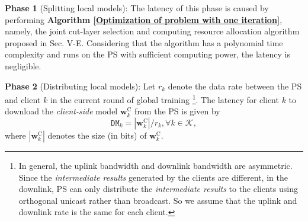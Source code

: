 \documentclass[10pt,journal,transmag]{IEEEtran}
\begin{document}
\textbf{Phase 1} (Splitting local models): The latency of this phase is caused by performing \textbf{Algorithm \ref{Optimization of problem with one iteration}}, namely, the joint cut-layer selection and computing resource allocation algorithm proposed in Sec. V-E. Considering that the algorithm has a polynomial time complexity and runs on the PS with sufficient computing power, the latency is negligible.

\textbf{Phase 2} (Distributing local models): Let $r_k$ denote the data rate between the PS and client $k$ in the current round of global training \footnote{In general, the uplink bandwidth and downlink bandwidth are asymmetric. Since the \textit{intermediate results} generated by the clients are different, in the downlink, PS can only distribute the \textit{intermediate results} to the clients using orthogonal unicast rather than broadcast. So we assume that the uplink and downlink rate is the same for each client.}. The latency for client $k$ to download the \textit{client-side} model $\textbf{w}^\text{C}_k$ from the PS is given by
\begin{equation}
   \texttt{DM}_k =  |\textbf{w}^\text{C}_k|/{r_k}, \forall k \in \mathcal{K}, \label{tau_sfl_k}
\end{equation}
where $|\textbf{w}^\text{C}_k|$ denotes the size (in bits) of $\textbf{w}^\text{C}_k$.
\end{document}
